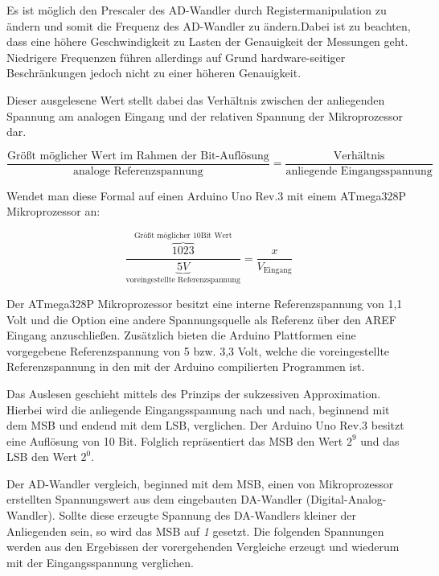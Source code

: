 Es ist  möglich den Prescaler des AD-Wandler durch Registermanipulation zu ändern\cite{atmelcorporationatmega48apa88apa168apa328p2014} und somit die Frequenz des AD-Wandler zu ändern.Dabei ist zu beachten, dass eine höhere Geschwindigkeit zu Lasten der Genauigkeit der Messungen geht. Niedrigere Frequenzen führen allerdings auf Grund hardware-seitiger Beschränkungen jedoch nicht zu einer höheren Genauigkeit.

Dieser ausgelesene Wert stellt dabei das Verhältnis zwischen der anliegenden Spannung am analogen Eingang und der relativen Spannung der Mikroprozessor dar.
\begin{center}
  \begin{equation}
  \label{eq: Formel zur Berechnung der anligenden Spannung in Relation zur Referenzspannung}
    \frac{\text{Größt möglicher Wert im Rahmen der Bit-Auflösung}}{\text{analoge Referenzspannung}} = \frac{\text{Verhältnis}}{\text{anliegende Eingangsspannung}}
  \end{equation}
\end{center}

Wendet man diese Formal auf einen Arduino Uno Rev.3 mit einem ATmega328P Mikroprozessor an:
\begin{center}
  \begin{equation}
      \frac{\overbrace{1023}^\text{Größt möglicher 10Bit Wert}}{\underbrace{5V}_\text{voreingestellte Referenzspannung}} = \frac{x}{V_\text{Eingang}}
  \end{equation}
\end{center}
Der ATmega328P Mikroprozessor besitzt eine interne Referenzspannung von 1,1 Volt und die Option eine andere Spannungsquelle als Referenz über den AREF Eingang anzuschließen\cite{atmelcorporationatmega48apa88apa168apa328p2014}. Zusätzlich bieten die Arduino Plattformen eine vorgegebene Referenzspannung von 5 bzw. 3,3 Volt\cite{arduino2015-1}, welche die voreingestellte Referenzspannung in den mit der Arduino  compilierten Programmen ist.


Das Auslesen geschieht mittels des Prinzips der sukzessiven Approximation. Hierbei wird die anliegende Eingangsspannung nach und nach, beginnend mit dem MSB und endend mit dem LSB, verglichen. Der Arduino Uno Rev.3 besitzt eine Auflösung von 10 Bit. Folglich repräsentiert das MSB den Wert $2^{9}$ und das LSB den Wert $2^{0}$.

Der AD-Wandler vergleich, beginned mit dem MSB, einen von Mikroprozessor erstellten Spannungswert aus dem eingebauten DA-Wandler (Digital-Analog-Wandler). Sollte diese erzeugte Spannung des DA-Wandlers kleiner der Anliegenden sein, so wird das MSB auf \textit{1} gesetzt. Die folgenden Spannungen werden aus den Ergebissen der vorergehenden Vergleiche erzeugt und wiederum mit der Eingangsspannung verglichen.

